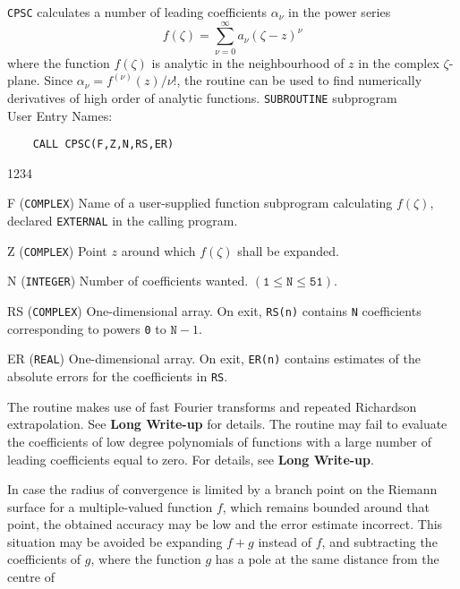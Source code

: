                        
                 
\Submitter{}                         
{\tt CPSC} calculates a number of leading coefficients $\alpha _\nu$
in the power series
$$ f(\zeta) = \sum_{\nu=0}^\infty a_\nu(\zeta - z)^\nu $$
where the function $f(\zeta)$ is analytic in the neighbourhood of $z$
in the complex $\zeta$-plane.
Since $\alpha_\nu= f^{(\nu)}(z)/\nu !$, the routine can be used to find
numerically derivatives of high order of analytic functions.
\Structure
{\tt SUBROUTINE} subprogram \\
User Entry Names: 
\Usage
\begin{verbatim}
    CALL CPSC(F,Z,N,RS,ER)
\end{verbatim}
\begin{DLtt}{1234}
\item [F]({\tt COMPLEX}) Name of a  user-supplied function subprogram
calculating $f(\zeta)$, declared {\tt EXTERNAL} in the calling
program.
\item [Z]({\tt COMPLEX}) Point $z$ around which $f(\zeta)$ shall be
expanded.
\item [N] ({\tt INTEGER}) Number of coefficients wanted.
$(\mathtt{1 \leq N \leq 51})$.
\item [RS] ({\tt COMPLEX}) One-dimensional array. On exit, {\tt RS(n)}
contains {\tt N} coefficients corresponding to powers {\tt 0} to
$\mathtt{N}-1$.
\item [ER] ({\tt REAL}) One-dimensional array. On exit, {\tt ER(n)}
contains estimates of the absolute errors for the coefficients in
{\tt RS}.
\end{DLtt}
\Method
The routine makes use of fast Fourier transforms and repeated
Richardson extrapolation. See {\bf Long Write-up} for details.
\Restrict
The routine may fail to
evaluate the coefficients of low degree polynomials of functions
with a large number of leading coefficients equal to zero. For
details, see {\bf Long Write-up}.
\par
In case the radius of convergence is limited by a branch point on
the Riemann surface for a multiple-valued function $f$, which remains
bounded around that point, the obtained accuracy may be low and the error
estimate incorrect. This situation may be avoided be expanding $f+g$
instead of $f$, and subtracting the coefficients of $g$, where the
function $g$ has a pole at the same distance from the centre of

